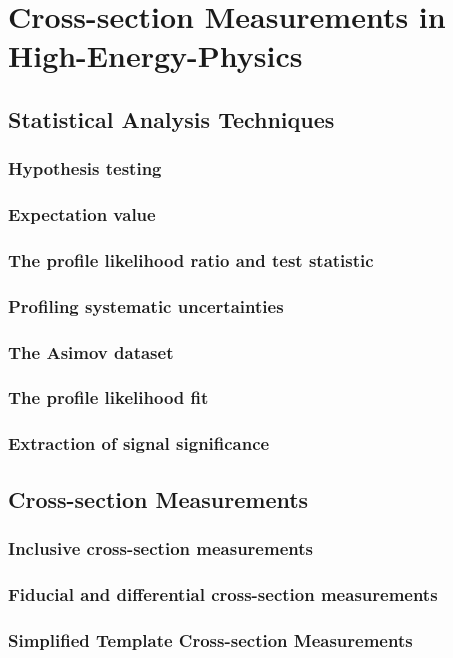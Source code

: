 \chapter{Cross-section Measurements in High-Energy-Physics}
\label{chap:statistics}

\section{Statistical Analysis Techniques}
\subsection{Hypothesis testing}
\subsection{Expectation value}
\subsection{The profile likelihood ratio and test statistic}
\subsection{Profiling systematic uncertainties}
\subsection{The Asimov dataset}
\subsection{The profile likelihood fit}
\subsection{Extraction of signal significance}

\section{Cross-section Measurements}
\subsection{Inclusive cross-section measurements}
\subsection{Fiducial and differential cross-section measurements}
\subsection{Simplified Template Cross-section Measurements}
